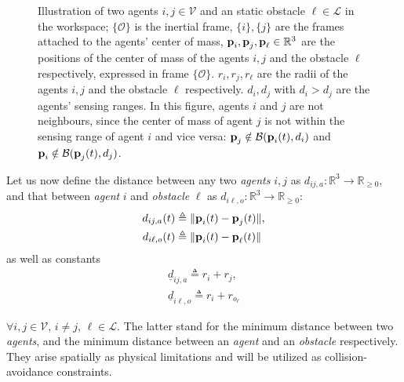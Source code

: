 \begin{figure}[ht!]
	\centering
    
    \caption{Illustration of two agents $i, j \in \mathcal{V}$ and an static
      obstacle $\ell \in \mathcal{L}$ in the workspace; $\{\mathcal{O}\}$ is the inertial
      frame, $\{i\}, \{j\}$ are the frames attached to the agents' center of
      mass, $\bm{\mathbf{p}}_i, \bm{\mathbf{p}}_j, \bm{\mathbf{p}}_{\ell} \in \mathbb{R}^3$ are the
      positions of the center of mass of the agents $i,j$ and the
      obstacle $\ell$ respectively, expressed in frame
      $\{\mathcal{O}\}$. $r_i, r_j, r_{\ell}$ are the radii of the agents $i,j$
      and the obstacle $\ell$ respectively. $d_i, d_j$ with
      $d_i > d_j$ are the agents' sensing ranges.
      In this figure, agents $i$ and $j$ are not neighbours, since the center
      of mass of agent $j$ is not within the sensing range of agent $i$ and vice
      versa: $\bm{\mathbf{p}}_j \notin \mathcal{B}(\bm{\mathbf{p}}_i(t), d_i)$ and
      $\bm{\mathbf{p}}_i \notin \mathcal{B}(\bm{\mathbf{p}}_j(t), d_j)$.}
	\label{fig:two_agents_one_obstacle}
\end{figure}

Let us now define the distance between any two \textit{agents} $i,j$ as
$d_{ij,a}: \mathbb{R}^3 \to \mathbb{R}_{\geq 0}$, and that between \textit{agent}
$i$ and \textit{obstacle} $\ell$ as
$d_{i\ell,o} : \mathbb{R}^3 \to \mathbb{R}_{\geq 0}$:
\begin{subequations}
	\begin{align}
    d_{ij,a}(t) &\triangleq \| \bm{\mathbf{p}}_i(t) - \bm{\mathbf{p}}_j(t) \|, \\
    d_{i\ell,o}(t) &\triangleq \| \bm{\mathbf{p}}_i(t) - \bm{\mathbf{p}}_\ell(t) \|
	\end{align}
\end{subequations}
as well as constants
\begin{subequations}
	\begin{align}
    \underline{d}_{ij, a} \triangleq r_{i} + r_{j}, \\
    \underline{d}_{i\ell, o} \triangleq r_{i} + r_{o_\ell}
	\end{align}
\end{subequations}

$\forall i, j \in \mathcal{V}$, $i \neq j$, $\ell \in \mathcal{L}$.
The latter stand for the minimum distance between two \textit{agents}, and the
minimum distance between an \textit{agent} and an \textit{obstacle}
respectively. They arise spatially as physical limitations and will be utilized
as collision-avoidance constraints.\\

